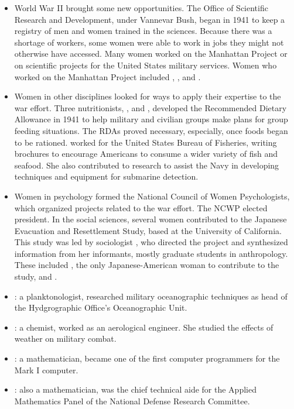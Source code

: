 \documentclass[12pt,a4paper]{article}
\begin{document}
\begin{enumerate}
\begin{itemize}
\begin{itemize}
        \item World War II brought some new opportunities. The Office of Scientific Research and Development, under Vannevar Bush, began in 1941 to keep a registry of men and women trained in the sciences. Because there was a shortage of workers, some women were able to work in jobs they might not otherwise have accessed. Many women worked on the Manhattan Project or on scientific projects for the United States military services. Women who worked on the Manhattan Project included , , and .
        \item Women in other disciplines looked for ways to apply their expertise to the war effort. Three nutritionists, , and , developed the Recommended Dietary Allowance in 1941 to help military and civilian groups make plans for group feeding situations. The RDAs proved necessary, especially, once foods began to be rationed.  worked for the United States Bureau of Fisheries, writing brochures to encourage Americans to consume a wider variety of fish and seafood. She also contributed to research to assist the Navy in developing techniques and equipment for submarine detection.
        \item Women in psychology formed the National Council of Women Psychologists, which organized projects related to the war effort. The NCWP elected  president. In the social sciences, several women contributed to the Japanese Evacuation and Resettlement Study, based at the University of California. This study was led by sociologist , who directed the project and synthesized information from her informants, mostly graduate students in anthropology. These included , the only Japanese-American woman to contribute to the study, and .
        \item {}: a planktonologist, researched military oceanographic techniques as head of the Hydgrographic Office's Oceanographic Unit.
        \item {}: a chemist, worked as an aerological engineer. She studied the effects of weather on military combat.
        \item {}: a mathematician, became one of the first computer programmers for the Mark I computer.
        \item {}: also a mathematician, was the chief technical aide for the Applied Mathematics Panel of the National Defense Research Committee. 

\end{itemize}
\end{itemize}
\end{enumerate}
\end{document}
